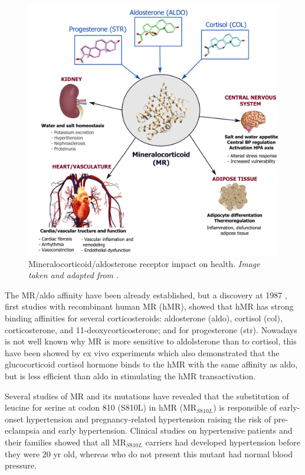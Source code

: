 \documentclass[letter,10pt, twocolumn]{article}
\begin{document}
\begin{figure}[h]
\hspace*{-15pt}   
\includegraphics[scale=0.35]{MR-AS4-COL.png}
\caption{Mineralocorticoid/aldosterone receptor impact on health. \textit{Image taken and adapted from \cite{book-MR_AS4}.}}
\label{MR_functions}
\end{figure}

The MR/aldo affinity have been already established, but a discovery at 1987 \cite{discovery}, first studies with recombinant human MR (hMR), showed that hMR has strong binding affinities for several corticosteroids: aldosterone (aldo), cortisol (col), corticosterone, and 11-deoxycorticosterone; and for progesterone (str). \cite{book-MR_AS4} Nowadays is not well known why MR is more sensitive to aldolsterone than to cortisol, this have been showed by ex vivo experiments which also demonstrated that the glucocorticoid cortisol hormone binds to the hMR with the same affinity as aldo, but is less efficient than aldo in stimulating the hMR transactivation. \cite{HELLALLEVY20001250}

Several studies of MR and its mutations have revealed that the substitution of leucine for serine at codon 810 (S810L) in hMR (MR$_{S810L}$) is responsible of early-onset hypertension and pregnancy-related hypertension raising the risk of pre-eclampsia and early hypertension. Clinical studies on hypertensive patients and their families showed that all MR$_{S810L}$ carriers had developed hypertension before they were 20 yr old, whereas who do not present this mutant had normal blood pressure. \cite{Severe, Activating_Mineralocorticoid}
\end{document}
